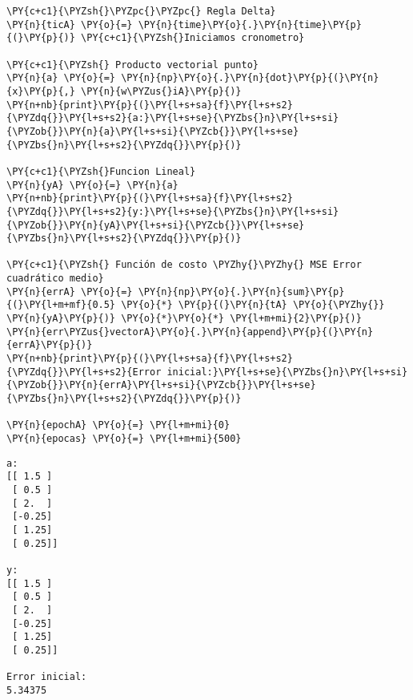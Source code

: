     \begin{tcolorbox}[breakable, size=fbox, boxrule=1pt, pad at break*=1mm,colback=cellbackground, colframe=cellborder]
\begin{Verbatim}[commandchars=\\\{\}]
\PY{c+c1}{\PYZsh{}\PYZpc{}\PYZpc{} Regla Delta}
\PY{n}{ticA} \PY{o}{=} \PY{n}{time}\PY{o}{.}\PY{n}{time}\PY{p}{(}\PY{p}{)} \PY{c+c1}{\PYZsh{}Iniciamos cronometro}

\PY{c+c1}{\PYZsh{} Producto vectorial punto}
\PY{n}{a} \PY{o}{=} \PY{n}{np}\PY{o}{.}\PY{n}{dot}\PY{p}{(}\PY{n}{x}\PY{p}{,} \PY{n}{w\PYZus{}iA}\PY{p}{)}
\PY{n+nb}{print}\PY{p}{(}\PY{l+s+sa}{f}\PY{l+s+s2}{\PYZdq{}}\PY{l+s+s2}{a:}\PY{l+s+se}{\PYZbs{}n}\PY{l+s+si}{\PYZob{}}\PY{n}{a}\PY{l+s+si}{\PYZcb{}}\PY{l+s+se}{\PYZbs{}n}\PY{l+s+s2}{\PYZdq{}}\PY{p}{)}

\PY{c+c1}{\PYZsh{}Funcion Lineal}
\PY{n}{yA} \PY{o}{=} \PY{n}{a}
\PY{n+nb}{print}\PY{p}{(}\PY{l+s+sa}{f}\PY{l+s+s2}{\PYZdq{}}\PY{l+s+s2}{y:}\PY{l+s+se}{\PYZbs{}n}\PY{l+s+si}{\PYZob{}}\PY{n}{yA}\PY{l+s+si}{\PYZcb{}}\PY{l+s+se}{\PYZbs{}n}\PY{l+s+s2}{\PYZdq{}}\PY{p}{)}

\PY{c+c1}{\PYZsh{} Función de costo \PYZhy{}\PYZhy{} MSE Error cuadrático medio}
\PY{n}{errA} \PY{o}{=} \PY{n}{np}\PY{o}{.}\PY{n}{sum}\PY{p}{(}\PY{l+m+mf}{0.5} \PY{o}{*} \PY{p}{(}\PY{n}{tA} \PY{o}{\PYZhy{}} \PY{n}{yA}\PY{p}{)} \PY{o}{*}\PY{o}{*} \PY{l+m+mi}{2}\PY{p}{)}
\PY{n}{err\PYZus{}vectorA}\PY{o}{.}\PY{n}{append}\PY{p}{(}\PY{n}{errA}\PY{p}{)}
\PY{n+nb}{print}\PY{p}{(}\PY{l+s+sa}{f}\PY{l+s+s2}{\PYZdq{}}\PY{l+s+s2}{Error inicial:}\PY{l+s+se}{\PYZbs{}n}\PY{l+s+si}{\PYZob{}}\PY{n}{errA}\PY{l+s+si}{\PYZcb{}}\PY{l+s+se}{\PYZbs{}n}\PY{l+s+s2}{\PYZdq{}}\PY{p}{)}

\PY{n}{epochA} \PY{o}{=} \PY{l+m+mi}{0}
\PY{n}{epocas} \PY{o}{=} \PY{l+m+mi}{500}
\end{Verbatim}
\end{tcolorbox}

    \begin{Verbatim}[commandchars=\\\{\}]
a:
[[ 1.5 ]
 [ 0.5 ]
 [ 2.  ]
 [-0.25]
 [ 1.25]
 [ 0.25]]

y:
[[ 1.5 ]
 [ 0.5 ]
 [ 2.  ]
 [-0.25]
 [ 1.25]
 [ 0.25]]

Error inicial:
5.34375

    \end{Verbatim}

